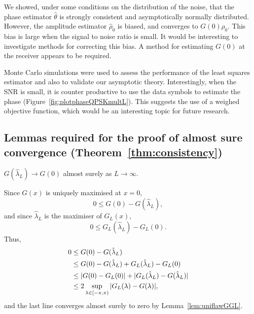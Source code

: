 \documentclass[journal]{IEEEtran}
\begin{document}
We showed, under some conditions on the distribution of the noise, that the phase estimator $\hat{\theta}$ is strongly consistent and asymptotically normally distributed.  However, the amplitude estimator $\hat{\rho}_0$ is biased, and converges to $G(0)\rho_0$.  This bias is large when the signal to noise ratio is small.  It would be interesting to investigate methods for correcting this bias.  A method for estimating $G(0)$ at the receiver appears to be required.

Monte Carlo simulations were used to assess the performance of the least squares estimator and also to validate our asymptotic theory.  Interestingly, when the SNR is small, it is counter productive to use the data symbols to estimate the phase (Figure~\ref{fig:plotphaseQPSKmultL}).  This suggests the use of a weighed objective function, which would be an interesting topic for future research.

\small


\normalsize
\appendix


\subsection{Lemmas required for the proof of almost sure convergence (Theorem~\ref{thm:consistency}) } \label{sec:proof-almost-sureappendix}

\begin{lemma}\label{lem:convtoexpGlamL} 
$G(\hat{\lambda}_L) \rightarrow G(0)$ almost surely as $L \rightarrow \infty$.
\end{lemma}
\begin{IEEEproof}
Since $G(x)$ is uniquely maximised at $x=0$,
\[
0 \leq G(0) - G(\hat{\lambda}_L),
\]
and since $\hat{\lambda}_L$ is the maximiser of $G_L(x)$,
\[ 
0 \leq G_L(\hat{\lambda}_L) - G_L(0).
\]
Thus,
\begin{align*}
0 &\leq G(0) - G(\hat{\lambda}_L) \\ 
& \leq G(0) - G(\hat{\lambda}_L) + G_L(\hat{\lambda}_L) - G_L(0) \\
& \leq |G(0) - G_L(0)| + |G_L(\hat{\lambda}_L) - G(\hat{\lambda}_L)| \\
&\leq 2\sup_{\lambda \in [-\pi, \pi)} {\vert G_L(\lambda) - G(\lambda) \vert},
\end{align*}
and the last line converges almost surely to zero by Lemma~\ref{lem:uniflawGGL}.
\end{IEEEproof}

\end{document}
